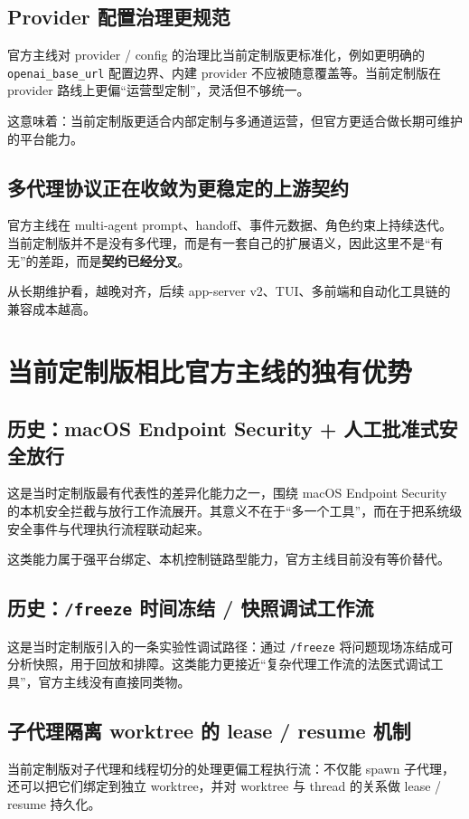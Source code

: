 \documentclass[UTF8,11pt]{ctexart}
\begin{document}
\subsection{Provider 配置治理更规范}
官方主线对 provider / config 的治理比当前定制版更标准化，例如更明确的 \texttt{openai\_base\_url} 配置边界、内建 provider 不应被随意覆盖等。当前定制版在 provider 路线上更偏“运营型定制”，灵活但不够统一。

这意味着：当前定制版更适合内部定制与多通道运营，但官方更适合做长期可维护的平台能力。

\subsection{多代理协议正在收敛为更稳定的上游契约}
官方主线在 multi-agent prompt、handoff、事件元数据、角色约束上持续迭代。当前定制版并不是没有多代理，而是有一套自己的扩展语义，因此这里不是“有无”的差距，而是\textbf{契约已经分叉}。

从长期维护看，越晚对齐，后续 app-server v2、TUI、多前端和自动化工具链的兼容成本越高。

\section{当前定制版相比官方主线的独有优势}

\subsection{历史：macOS Endpoint Security + 人工批准式安全放行}
这是当时定制版最有代表性的差异化能力之一，围绕 macOS Endpoint Security 的本机安全拦截与放行工作流展开。其意义不在于“多一个工具”，而在于把系统级安全事件与代理执行流程联动起来。

这类能力属于强平台绑定、本机控制链路型能力，官方主线目前没有等价替代。

\subsection{历史：\texttt{/freeze} 时间冻结 / 快照调试工作流}
这是当时定制版引入的一条实验性调试路径：通过 \texttt{/freeze} 将问题现场冻结成可分析快照，用于回放和排障。这类能力更接近“复杂代理工作流的法医式调试工具”，官方主线没有直接同类物。

\subsection{子代理隔离 worktree 的 lease / resume 机制}
当前定制版对子代理和线程切分的处理更偏工程执行流：不仅能 spawn 子代理，还可以把它们绑定到独立 worktree，并对 worktree 与 thread 的关系做 lease / resume 持久化。
\end{document}
